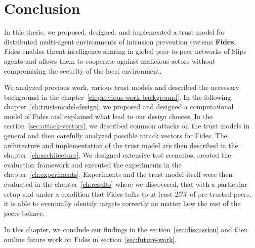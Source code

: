 \chapter{Conclusion}
\label{ch:conclusion}
In this thesis, we proposed, designed, and implemented a trust model for distributed multi-agent environments of intrusion prevention systems \textbf{Fides}.
Fides enables threat intelligence sharing in global peer-to-peer networks of Slips agents and allows them to cooperate against malicious actors without compromising the security of the local environment. 

We analyzed previous work, various trust models and described the necessary background in the chapter~\ref{ch:previous-work-background}.
In the following chapter~\ref{ch:trust-model-design}, we proposed and designed a computational model of Fides and explained what lead to our design choices.
In the section~\ref{sec:attack-vectors}, we described common attacks on the trust models in general and then carefully analyzed possible attack vectors for Fides.
The architecture and implementation of the trust model are then described in the chapter~\ref{ch:architecture}.
We designed extensive test scenarios, created the evaluation framework and executed the experiments in the chapter~\ref{ch:experiments}.
Experiments and the trust model itself were then evaluated in the chapter~\ref{ch:results} where we discovered, that with a particular setup and under a condition that Fides talks to at least 25\% of pre-trusted peers, it is able to eventually identify targets correctly no matter how the rest of the peers behave.

In this chapter, we conclude our findings in the section~\ref{sec:discussion} and then outline future work on Fides in section~\ref{sec:future-work}.



